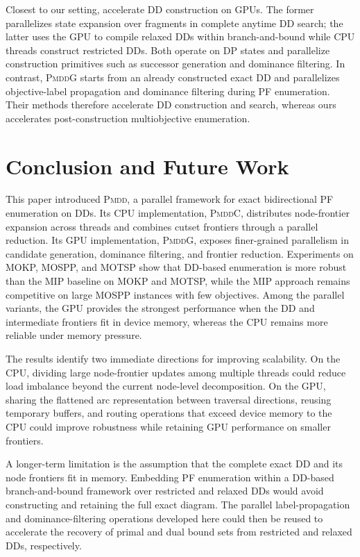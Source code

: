 \documentclass[letterpaper]{article}
\begin{document}
Closest to our setting, \citet{tardivo2026complete,tardivo2026gpu} accelerate DD construction on GPUs. The former parallelizes state expansion over fragments in complete anytime DD search; the latter uses the GPU to compile relaxed DDs within branch-and-bound while CPU threads construct restricted DDs. Both operate on DP states and parallelize construction primitives such as successor generation and dominance filtering. In contrast, \textsc{PmddG} starts from an already constructed exact DD and parallelizes objective-label propagation and dominance filtering during PF enumeration. Their methods therefore accelerate DD construction and search, whereas ours accelerates post-construction multiobjective enumeration.

\section{Conclusion and Future Work}
\label{sec:conclusion}
This paper introduced \textsc{Pmdd}, a parallel framework for exact bidirectional PF enumeration on DDs. Its CPU implementation, \textsc{PmddC}, distributes node-frontier expansion across threads and combines cutset frontiers through a parallel reduction. Its GPU implementation, \textsc{PmddG}, exposes finer-grained parallelism in candidate generation, dominance filtering, and frontier reduction. Experiments on MOKP, MOSPP, and MOTSP show that DD-based enumeration is more robust than the MIP baseline on MOKP and MOTSP, while the MIP approach remains competitive on large MOSPP instances with few objectives. Among the parallel variants, the GPU provides the strongest performance when the DD and intermediate frontiers fit in device memory, whereas the CPU remains more reliable under memory pressure.

The results identify two immediate directions for improving scalability. On the CPU, dividing large node-frontier updates among multiple threads could reduce load imbalance beyond the current node-level decomposition. On the GPU, sharing the flattened arc representation between traversal directions, reusing temporary buffers, and routing operations that exceed device memory to the CPU could improve robustness while retaining GPU performance on smaller frontiers.

A longer-term limitation is the assumption that the complete exact DD and its node frontiers fit in memory. Embedding PF enumeration within a DD-based branch-and-bound framework over restricted and relaxed DDs \citep{bergman2016decision} would avoid constructing and retaining the full exact diagram. The parallel label-propagation and dominance-filtering operations developed here could then be reused to accelerate the recovery of primal and dual bound sets from restricted and relaxed DDs, respectively.
\end{document}
